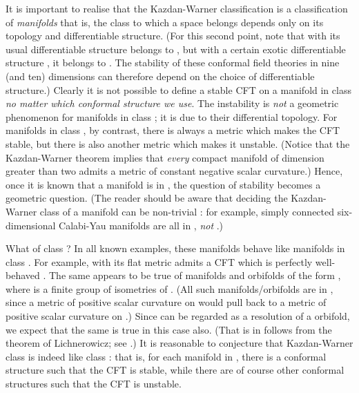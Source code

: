 \documentclass[a4paper,12pt]{article}
\theoremstyle{definition}
\renewcommand{\u}{\textit}
\renewcommand{\-}{\myHighlight{$\dfrac{\quad\enspace}{\quad}$}\coordHE{}}
\begin{document}
It is important to realise that the Kazdan-Warner classification is a classification of \u{manifolds} \- that is, the class to which a space belongs depends only on its topology and differentiable structure. (For this second point, note that \coordHE{} with its usual differentiable structure belongs to \coordHE{}, but with a certain exotic differentiable structure \cite{13}, it belongs to \coordHE{}. The stability of these conformal field theories in nine (and ten) dimensions can therefore depend on the choice of differentiable structure.) Clearly it is not possible to define a stable CFT on a manifold in class \coordHE{} \u{no matter which conformal structure we use}. The instability is \u{not} a geometric phenomenon for manifolds in class \coordHE{}; it is due to their differential topology. For manifolds in class \coordHE{}, by contrast, there is always a metric which makes the CFT stable, but there is also another metric which makes it unstable. (Notice that the Kazdan-Warner theorem implies that \u{every} compact manifold of dimension greater than two admits a metric of constant negative scalar curvature.) Hence, once it is known that a manifold is in \coordHE{}, the question of stability becomes a geometric question. (The reader should be aware that deciding the Kazdan-Warner class of a manifold can be non-trivial :  for example, simply connected six-dimensional Calabi-Yau manifolds are all in \coordHE{}, \u{not} \coordHE{}.)

What of class \coordHE{}? In all known examples, these manifolds behave like manifolds in class \coordHE{}. For example, \coordHE{} with its flat metric admits a CFT which is perfectly well-behaved \cite{14}. The same appears to be true of manifolds and orbifolds of the form \coordHE{}, where \myHighlight{$\Delta$}\coordHE{} is a finite group of isometries of \coordHE{}. (All such manifolds/orbifolds are in \coordHE{}, since a metric of positive scalar curvature on \coordHE{} would pull back to a metric of positive scalar curvature on \coordHE{}.) Since \coordHE{} can be regarded as a resolution of a \coordHE{} orbifold, we expect that the same is true in this case also. (That \coordHE{} is in \coordHE{} follows from the theorem of Lichnerowicz; see \cite{12}.) It is reasonable to conjecture that Kazdan-Warner class \coordHE{} is indeed like class \coordHE{} : that is, for each manifold in \coordHE{}, there is a conformal structure such that the CFT is stable, while there are of course other conformal structures such that the CFT is unstable.
\end{document}
